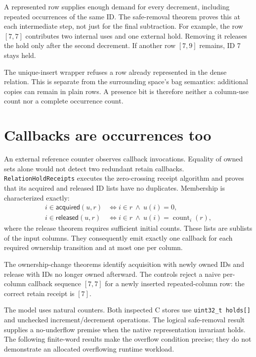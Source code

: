 \documentclass[11pt,a4paper]{article}
\newcommand{\code}[1]{\nolinkurl{#1}}
\begin{document}
A represented row supplies enough demand for every decrement, including
repeated occurrences of the same ID. The safe-removal theorem proves this
at each intermediate step, not just for the final subtraction. For example,
the row $[7,7]$ contributes two internal uses and one external hold. Removing
it releases the hold only after the second decrement. If another row
$[7,9]$ remains, ID 7 stays held.

The unique-insert wrapper refuses a row already represented in the dense
relation. This is separate from the surrounding space's bag semantics:
additional copies can remain in plain rows. A presence bit is therefore
neither a column-use count nor a complete occurrence count.

\section{Callbacks are occurrences too}

An external reference counter observes callback invocations. Equality of
owned sets alone would not detect two redundant retain callbacks.
\code{RelationHoldReceipts} executes the zero-crossing receipt algorithm and
proves that its acquired and released ID lists have no duplicates. Membership
is characterized exactly:
\begin{align*}
 i\in\mathsf{acquired}(u,r)
   &\Longleftrightarrow i\in r\ \land\ u(i)=0,\\
 i\in\mathsf{released}(u,r)
   &\Longleftrightarrow i\in r\ \land\ u(i)=\operatorname{count}_i(r),
\end{align*}
where the release theorem requires sufficient initial counts. These lists
are sublists of the input columns. They consequently emit exactly one
callback for each required ownership transition and at most one per column.

The ownership-change theorems identify acquisition with newly owned IDs and
release with IDs no longer owned afterward. The controls reject a naive
per-column callback sequence $[7,7]$ for a newly inserted repeated-column row:
the correct retain receipt is $[7]$.

The model uses natural counters. Both inspected C stores use
\verb|uint32_t holds[]| and unchecked increment/decrement operations. The
logical safe-removal result supplies a no-underflow premise when the native
representation invariant holds. The following finite-word results make the
overflow condition precise; they do not demonstrate an allocated overflowing
runtime workload.
\end{document}
